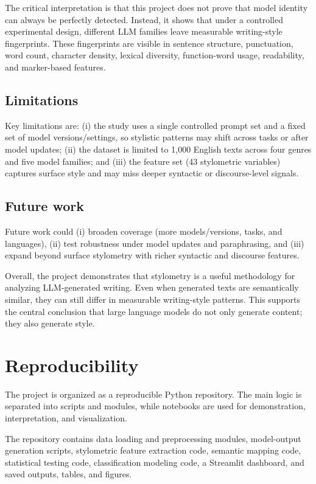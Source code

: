 The critical interpretation is that this project does not prove that model identity can always be perfectly detected. Instead, it shows that under a controlled experimental design, different LLM families leave measurable writing-style fingerprints. These fingerprints are visible in sentence structure, punctuation, word count, character density, lexical diversity, function-word usage, readability, and marker-based features.

\subsection{Limitations}
Key limitations are: (i) the study uses a single controlled prompt set and a fixed set of model versions/settings, so stylistic patterns may shift across tasks or after model updates; (ii) the dataset is limited to 1{,}000 English texts across four genres and five model families; and (iii) the feature set (43 stylometric variables) captures surface style and may miss deeper syntactic or discourse-level signals.

\subsection{Future work}
Future work could (i) broaden coverage (more models/versions, tasks, and languages), (ii) test robustness under model updates and paraphrasing, and (iii) expand beyond surface stylometry with richer syntactic and discourse features.

Overall, the project demonstrates that stylometry is a useful methodology for analyzing LLM-generated writing. Even when generated texts are semantically similar, they can still differ in measurable writing-style patterns. This supports the central conclusion that large language models do not only generate content; they also generate style.

\section{Reproducibility}
The project is organized as a reproducible Python repository. The main logic is separated into scripts and modules, while notebooks are used for demonstration, interpretation, and visualization.

The repository contains data loading and preprocessing modules, model-output generation scripts, stylometric feature extraction code, semantic mapping code, statistical testing code, classification modeling code, a Streamlit dashboard, and saved outputs, tables, and figures.

